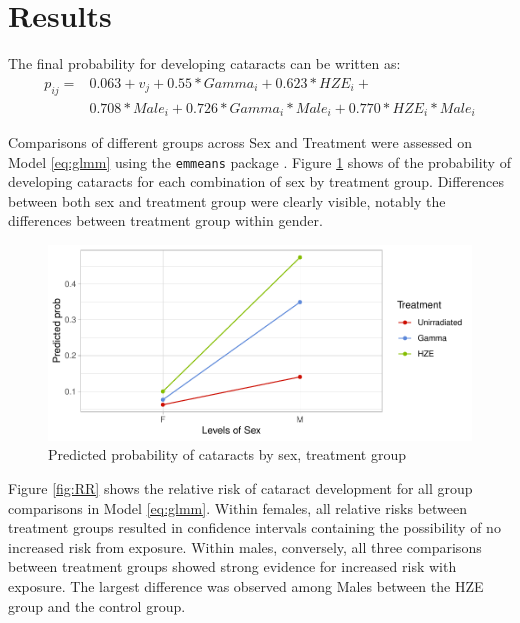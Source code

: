 \documentclass[12pt]{article}
\begin{document}
\section{Results}
\label{sec:results}

The final probability for developing cataracts can be written as:\\
\begin{equation}
\begin{aligned}
p_{ij} = &0.063 + v_j + 0.55*Gamma_i + 0.623*HZE_i + \\
&0.708*Male_i + 0.726*Gamma_i*Male_i + 0.770*HZE_i*Male_i
\end{aligned}
\label{eq:probs}
\end{equation}

Comparisons of different groups across Sex and Treatment were assessed on Model \eqref{eq:glmm} using the \texttt{emmeans} package \citep{R-emmeans}. Figure \ref{fig:contr} shows of the probability of developing cataracts for each combination of sex by treatment group. Differences between both sex and treatment group were clearly visible, notably the differences between treatment group within gender.

\begin{figure}[H]

{\centering \includegraphics{bookdown_report_files/figure-latex/contr-1} 

}

\caption{Predicted probability of cataracts by sex, treatment group}\label{fig:contr}
\end{figure}

Figure \ref{fig:RR} shows the relative risk of cataract development for all group comparisons in Model \eqref{eq:glmm}. Within females, all relative risks between treatment groups resulted in confidence intervals containing the possibility of no increased risk from exposure. Within males, conversely, all three comparisons between treatment groups showed strong evidence for increased risk with exposure. The largest difference was observed among Males between the HZE group and the control group.
\end{document}
